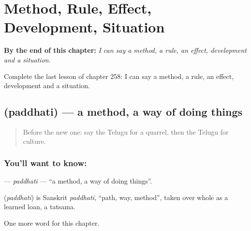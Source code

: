 
\chapter{Method, Rule, Effect, Development, Situation}
\label{ch:te-method-rule-effect-development-situation}

\begin{chapteropening}
\textbf{By the end of this chapter:} \emph{I can say a method, a rule, an effect, development and a situation.}

Complete the last lesson of chapter 258: I can say a method, a rule, an effect, development and a situation.
\end{chapteropening}

\section[\texorpdfstring{\te{పద్ధతి} (paddhati)}{పద్ధతి (paddhati)}]{ (paddhati) — a method, a way of doing things}

\label{lesson:TE-C258-paddhati}



\begin{quote}
Before the new one: say the Telugu for a quarrel, then the Telugu for culture.
\end{quote}

\subsection*{You'll want to know: }
\textbf{} — \emph{paddhati} — \textquotedblleft{}a method, a way of doing things\textquotedblright{}.

\begin{cousinweb}
\textbf{} (\emph{paddhati}) is Sanskrit \emph{paddhati}, \textquotedblleft{}path, way, method\textquotedblright{}, taken over whole as a learned loan, a tatsama.
\end{cousinweb}

\begin{grammarlens}[title={What you've built}]
One more word for this chapter.
\end{grammarlens}

